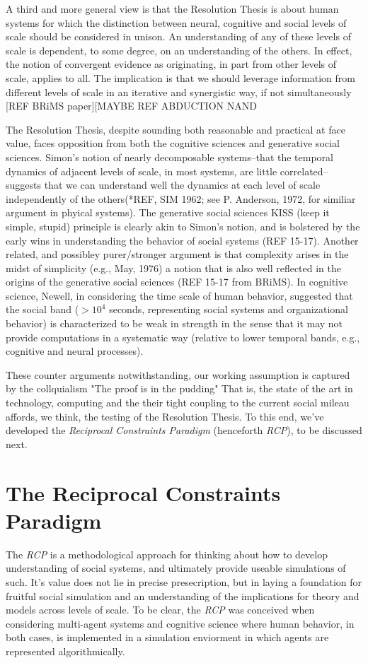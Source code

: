 \documentclass{article}
\begin{document}
A third and more general view is that the Resolution Thesis is about human systems for which the distinction between neural, cognitive and social levels of scale should be considered in unison.  An understanding of any of these levels of scale is dependent, to some degree, on an understanding of the others.  In effect, the notion of convergent evidence as originating, in part from other levels of scale, applies to all.  The implication is that we should leverage information from different levels of scale in an iterative and synergistic way, if not simultaneously [REF BRiMS paper][MAYBE REF ABDUCTION NAND 

The Resolution Thesis, despite sounding both reasonable and practical at face value, faces opposition from both the cognitive sciences and generative social sciences.  Simon's notion of nearly decomposable systems--that the temporal dynamics of adjacent levels of scale, in most systems, are little correlated--suggests that we can understand well the dynamics at each level of scale independently of the others(*REF, SIM 1962; see P. Anderson, 1972, for similiar argument in phyical systems).  The generative social sciences KISS (keep it simple, stupid) principle is clearly akin to Simon's notion, and is bolstered by the early wins in understanding the behavior of social systems (REF 15-17).   Another related, and possibley purer/stronger argument is that complexity arises in the midst of simplicity (e.g., May, 1976) a notion that is also well reflected in the origins of the generative social sciences (REF 15-17 from BRiMS).  In cognitive science, Newell, in considering the time scale of human behavior, suggested that the social band ($> 10^4$ seconds, representing social systems and organizational behavior) is characterized to be weak in strength in the sense that it may not provide computations in a systematic way (relative to lower temporal bands, e.g., cognitive and neural processes).  

These counter arguments notwithstanding, our working assumption is captured by the collquialism "The proof is in the pudding"  That is, the state of the art in technology, computing and the their tight coupling to the current social mileau affords, we think, the testing of the Resolution Thesis.   To this end, we've developed the \textit{Reciprocal Constraints Paradigm} (henceforth \textit{RCP}), to be discussed next.


\section{The Reciprocal Constraints Paradigm}
The \textit{RCP} is a methodological approach for thinking about how to develop understanding of social systems, and ultimately provide useable simulations of such.  It's value does not lie in precise presecription, but in laying a foundation for fruitful social simulation and an understanding of the implications for theory and models across levels of scale.  To be clear, the \textit{RCP} was conceived when considering multi-agent systems and cognitive science where human behavior, in both cases, is implemented in a simulation enviorment in which agents are represented algorithmically.
\end{document}
